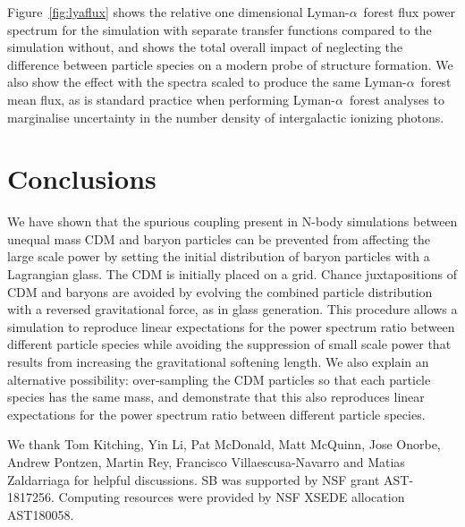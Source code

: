 \documentclass[a4paper,11pt]{article}
\newcommand{\Lya}{Lyman-$\alpha$}
\begin{document}
Figure~\ref{fig:lyaflux} shows the relative one dimensional \Lya~forest flux power spectrum for the simulation with separate transfer functions compared to the simulation without, and shows the total overall impact of neglecting the difference between particle species on a modern probe of structure formation. We also show the effect with the spectra scaled to produce the same \Lya~forest mean flux, as is standard practice when performing \Lya~forest analyses to marginalise uncertainty in the number density of intergalactic ionizing photons.

\section{Conclusions}

We have shown that the spurious coupling present in N-body simulations between unequal mass CDM and baryon particles can be prevented from affecting the large scale power by setting the initial distribution of baryon particles with a Lagrangian glass. The CDM is initially placed on a grid. Chance juxtapositions of CDM and baryons are avoided by evolving the combined particle distribution with a reversed gravitational force, as in glass generation. This procedure allows a simulation to reproduce linear expectations for the power spectrum ratio between different particle species while avoiding the suppression of small scale power that results from increasing the gravitational softening length. We also explain an alternative possibility: over-sampling the CDM particles so that each particle species has the same mass, and demonstrate that this also reproduces linear expectations for the power spectrum ratio between different particle species.

\acknowledgments

We thank Tom Kitching, Yin Li, Pat McDonald, Matt McQuinn, Jose Onorbe, Andrew Pontzen, Martin Rey, Francisco Villaescusa-Navarro and Matias Zaldarriaga for helpful discussions. SB was supported by NSF grant AST-1817256. Computing resources were provided by NSF XSEDE allocation AST180058.



\end{document}

